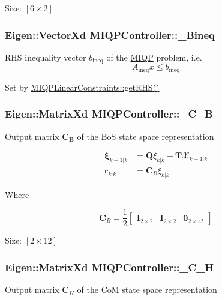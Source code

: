 \-Size\-: $[6\times2]$ \hypertarget{classMIQPController_a02d441467a51e81e969163f096d3798a}{
\subsubsection[{\-\_\-\-Bineq}]{\setlength{\rightskip}{0pt plus 5cm}\-Eigen\-::\-Vector\-Xd {\bf \-M\-I\-Q\-P\-Controller\-::\-\_\-\-Bineq}}}\label{classMIQPController_a02d441467a51e81e969163f096d3798a}
\-R\-H\-S inequality vector $b_{\text{ineq}}$ of the \hyperlink{namespaceMIQP}{\-M\-I\-Q\-P} problem, i.\-e. \[ A_{\text{ineq}} x \leq b_{\text{ineq}} \]

\-Set by \hyperlink{classMIQPLinearConstraints_abf2bd3e8f0dfa5b919efa1b90b56232a}{\-M\-I\-Q\-P\-Linear\-Constraints\-::get\-R\-H\-S()} \hypertarget{classMIQPController_a5c6882cb248e9d16513868fea7835d6e}{
\subsubsection[{\-\_\-\-C\-\_\-\-B}]{\setlength{\rightskip}{0pt plus 5cm}\-Eigen\-::\-Matrix\-Xd {\bf \-M\-I\-Q\-P\-Controller\-::\-\_\-\-C\-\_\-\-B}}}\label{classMIQPController_a5c6882cb248e9d16513868fea7835d6e}
\-Output matrix $\mathbf{C_B}$ of the \-Bo\-S state space representation

\begin{align*} \mathbf{\xi}_{k+1|k} &= \mathbf{Q} \xi_{k|k} + \mathbf{T}\mathcal{X}_{k+1|k} \\ \mathbf{r}_{k|k} & =\mathbf{C}_B \xi_{k|k} \end{align*}

\-Where

\[ \mathbf{C}_B = \frac{1}{2} \left[ \begin{array}{ccc} \mathbf{I}_{2\times2} & \mathbf{I}_{2\times2} & \mathbf{0}_{2\times12} \end{array}\right] \]

\-Size\-: $[2\times12]$ \hypertarget{classMIQPController_a323718c0eaf8c8a7e159ea7f1ef5b72c}{
\subsubsection[{\-\_\-\-C\-\_\-\-H}]{\setlength{\rightskip}{0pt plus 5cm}\-Eigen\-::\-Matrix\-Xd {\bf \-M\-I\-Q\-P\-Controller\-::\-\_\-\-C\-\_\-\-H}}}\label{classMIQPController_a323718c0eaf8c8a7e159ea7f1ef5b72c}
\-Output matrix $\mathbf{C}_H$ of the \-Co\-M state space representation

